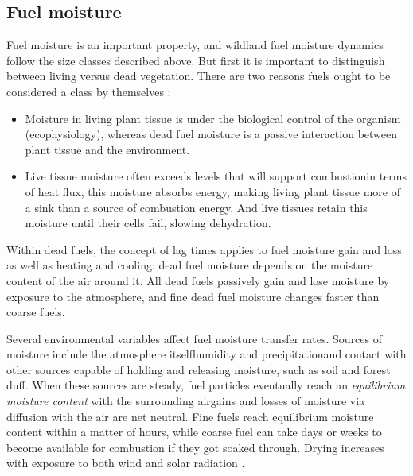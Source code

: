 \subsection{Fuel moisture}

Fuel moisture is an important property, and wildland fuel moisture dynamics follow the size classes described above. 
But first it is important to distinguish between living versus dead vegetation. 
There are two reasons fuels ought to be considered a class by themselves \citep{finney2013}: 
\begin{itemize}
	\item Moisture in living plant tissue is under the biological control of the organism (ecophysiology), whereas dead fuel moisture is a passive interaction between plant tissue and the environment.
	\item Live tissue moisture often exceeds levels that will support combustion\textemdash in terms of heat flux, this moisture absorbs energy, making living plant tissue more of a sink than a source of combustion energy.
	And live tissues retain this moisture until their cells fail, slowing dehydration.  
\end{itemize}

Within dead fuels, the concept of lag times applies to fuel moisture gain and loss as well as heating and cooling: dead fuel moisture depends on the moisture content of the air around it. 
All dead fuels passively gain and lose moisture by exposure to the atmosphere, and fine dead fuel moisture changes faster than coarse fuels. 

Several environmental variables affect fuel moisture transfer rates.
Sources of moisture include the atmosphere itself\textemdash humidity and precipitation\textemdash and contact with other sources capable of holding and releasing moisture, such as soil and forest duff.
When these sources are steady, fuel particles eventually reach an \emph{equilibrium moisture content} with the surrounding air\textemdash gains and losses of moisture via diffusion with the air are net neutral. 
Fine fuels reach equilibrium moisture content within a matter of hours, while coarse fuel can take days or weeks to become available for combustion if they got soaked through.
Drying increases with exposure to both wind and solar radiation \citep{byram1943}.

